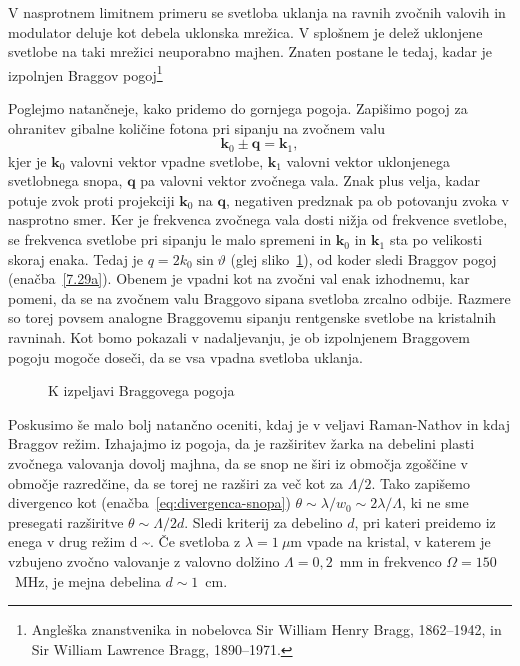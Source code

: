 V nasprotnem limitnem primeru se svetloba uklanja na ravnih zvočnih valovih in modulator deluje 
kot debela uklonska mrežica. V splošnem je delež uklonjene svetlobe na taki mrežici 
neuporabno majhen. 
Znaten postane le tedaj, kadar je izpolnjen Braggov
pogoj\footnote{Angleška znanstvenika in nobelovca Sir William Henry Bragg, 1862--1942,
in Sir William Lawrence Bragg, 1890--1971.}

Poglejmo natančneje, kako pridemo do gornjega pogoja. Zapišimo pogoj
za ohranitev gibalne količine fotona pri sipanju na zvočnem valu
\begin{equation}
\mathbf{k}_{0}\pm\mathbf{q}=\mathbf{k}_{1},
\label{7.30}
\end{equation}
kjer je $\mathbf{k}_{0}$ valovni vektor vpadne svetlobe, $\mathbf{k}_{1}$
valovni vektor uklonjenega svetlobnega snopa, $\mathbf{q}$ pa valovni
vektor zvočnega vala. Znak plus velja, kadar potuje zvok proti projekciji
$\mathbf{k}_{0}$ na $\mathbf{q}$, negativen predznak pa ob potovanju zvoka v nasprotno smer. 
Ker je frekvenca zvočnega vala dosti nižja od frekvence svetlobe, se frekvenca svetlobe 
pri sipanju le malo spremeni in $\mathbf{k}_{0}$ in $\mathbf{k}_{1}$ sta po velikosti skoraj enaka.
Tedaj je $q=2k_{0}\sin\vartheta$ (glej sliko~\ref{fig:ao_bragg3}), od koder sledi Braggov pogoj 
(enačba~\ref{7.29a}). Obenem je vpadni kot na zvočni val enak izhodnemu, kar pomeni, da se na
zvočnem valu Braggovo sipana svetloba zrcalno odbije. Razmere so torej
povsem analogne Braggovemu sipanju rentgenske svetlobe na kristalnih
ravninah. Kot bomo pokazali v nadaljevanju, je ob izpolnjenem Braggovem pogoju mogoče doseči, 
da se vsa vpadna svetloba uklanja.
\begin{figure}[h]
\centering
\def\svgwidth{40truemm} 

\caption{K izpeljavi Braggovega pogoja}
\label{fig:ao_bragg3}
\end{figure}
\begin{remark}
 Poskusimo še malo bolj natančno oceniti, kdaj je v veljavi Raman-Nathov in kdaj Braggov režim. 
Izhajajmo iz pogoja, da je razširitev žarka na debelini plasti zvočnega valovanja dovolj
 majhna, da se snop ne širi iz območja zgoščine v območje razredčine, da se torej ne razširi za 
 več kot za $\Lambda/2$. Tako zapišemo
 divergenco kot (enačba~\ref{eq:divergenca-snopa}) $\theta \sim \lambda/w_0 \sim 2\lambda/\Lambda$,
  ki ne sme presegati razširitve $\theta \sim \Lambda/2d$.
  Sledi kriterij za debelino $d$, pri kateri preidemo iz enega v drug režim
\beq
d \sim {}.
\eeq
Če svetloba z $\lambda = 1~\mu$m vpade na kristal, v katerem je vzbujeno zvočno
valovanje z valovno dolžino $\Lambda = 0,2$~mm in frekvenco $\Omega = 150$~MHz, je mejna 
debelina $d \sim 1$~cm.
\end{remark}

